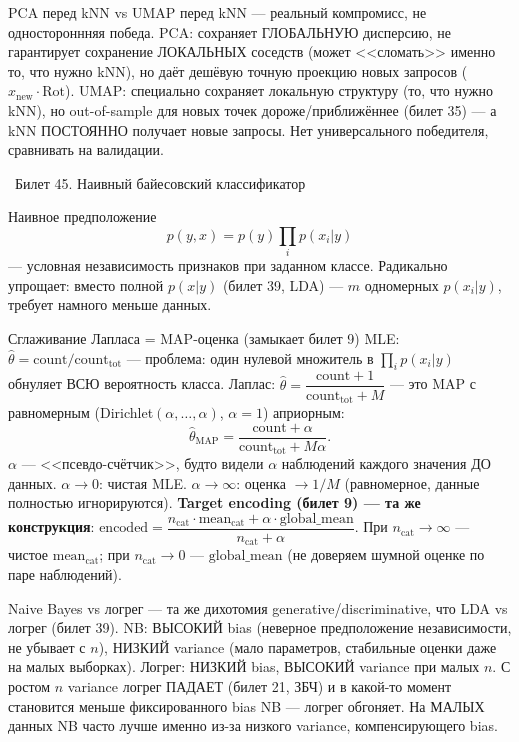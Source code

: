 \documentclass[12pt, a4paper]{article}
\newcommand{\bilet}[2]{%
  \vspace{10pt}%
  \noindent\colorbox{qcolor}{\parbox{\dimexpr\linewidth-2\fboxsep\relax}{%
    \color{white}\large\bfseries\strut\ Билет #1. #2%
  }}%
  \nopagebreak\vspace{5pt}\par\nopagebreak%
}
\begin{document}
\begin{fishkabox}
PCA перед kNN vs UMAP перед kNN --- реальный компромисс, не одностороннняя победа. PCA: сохраняет ГЛОБАЛЬНУЮ дисперсию, не гарантирует сохранение ЛОКАЛЬНЫХ соседств (может <<сломать>> именно то, что нужно kNN), но даёт дешёвую точную проекцию новых запросов ($x_{\text{new}}\cdot\text{Rot}$). UMAP: специально сохраняет локальную структуру (то, что нужно kNN), но out-of-sample для новых точек дороже/приближённее (билет 35) --- а kNN ПОСТОЯННО получает новые запросы. Нет универсального победителя, сравнивать на валидации.
\end{fishkabox}

\bilet{45}{Наивный байесовский классификатор}

\begin{defbox}{Наивное предположение}
\[
  p(y,x)=p(y)\prod_i p(x_i|y)
\]
--- условная независимость признаков при заданном классе. Радикально упрощает: вместо полной $p(x|y)$ (билет 39, LDA) --- $m$ одномерных $p(x_i|y)$, требует намного меньше данных.
\end{defbox}

\begin{proofbox}{Сглаживание Лапласа = MAP-оценка (замыкает билет 9)}
MLE: $\hat\theta=\text{count}/\text{count}_{\text{tot}}$ --- проблема: один нулевой множитель в $\prod_i p(x_i|y)$ обнуляет ВСЮ вероятность класса.
Лаплас: $\hat\theta=\dfrac{\text{count}+1}{\text{count}_{\text{tot}}+M}$ --- это MAP с равномерным (Dirichlet$(\alpha,\dots,\alpha)$, $\alpha=1$) априорным:
\[
  \hat\theta_{\text{MAP}}=\frac{\text{count}+\alpha}{\text{count}_{\text{tot}}+M\alpha}.
\]
$\alpha$ --- <<псевдо-счётчик>>, будто видели $\alpha$ наблюдений каждого значения ДО данных. $\alpha\to0$: чистая MLE. $\alpha\to\infty$: оценка $\to1/M$ (равномерное, данные полностью игнорируются).
\textbf{Target encoding (билет 9) --- та же конструкция}: $\text{encoded}=\dfrac{n_{\text{cat}}\cdot\text{mean}_{\text{cat}}+\alpha\cdot\text{global\_mean}}{n_{\text{cat}}+\alpha}$. При $n_{\text{cat}}\to\infty$ --- чистое $\text{mean}_{\text{cat}}$; при $n_{\text{cat}}\to0$ --- $\text{global\_mean}$ (не доверяем шумной оценке по паре наблюдений).
\end{proofbox}

\begin{fishkabox}
Naive Bayes vs логрег --- та же дихотомия generative/discriminative, что LDA vs логрег (билет 39). NB: ВЫСОКИЙ bias (неверное предположение независимости, не убывает с $n$), НИЗКИЙ variance (мало параметров, стабильные оценки даже на малых выборках). Логрег: НИЗКИЙ bias, ВЫСОКИЙ variance при малых $n$. С ростом $n$ variance логрег ПАДАЕТ (билет 21, ЗБЧ) и в какой-то момент становится меньше фиксированного bias NB --- логрег обгоняет. На МАЛЫХ данных NB часто лучше именно из-за низкого variance, компенсирующего bias.
\end{fishkabox}
\end{document}
